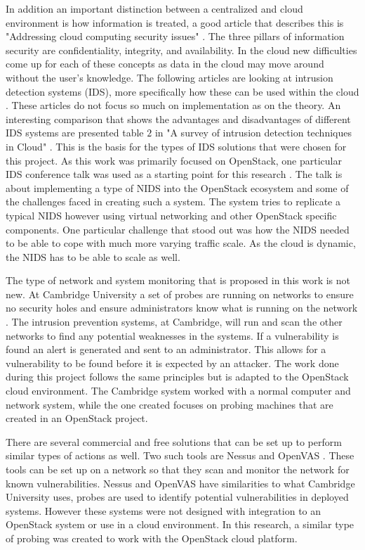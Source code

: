 \documentclass[12pt]{article}
\begin{document}
In addition an important distinction between a centralized and cloud environment is how information is treated, a good article that describes this is "Addressing cloud computing security issues" \cite{zissis2012addressing}. The three pillars of information security are confidentiality, integrity, and availability. In the cloud new difficulties come up for each of these concepts as data in the cloud may move around without the user's knowledge.  The following articles are looking at intrusion detection systems (IDS), more specifically how these can be used within the cloud \cite{SurveyOfIDS, patel2013intrusion}. These articles do not focus so much on implementation as on the theory. An interesting comparison that shows the advantages and disadvantages of different IDS systems are presented table $2$ in "A survey of intrusion detection techniques in Cloud" \cite{SurveyOfIDS}. This is the basis for the types of IDS solutions that were chosen for this project. As this work was primarily focused on OpenStack, one particular IDS conference talk was used as a starting point for this research \cite{videoPresentation}. The talk is about implementing a type of NIDS into the OpenStack ecosystem and some of the challenges faced in creating such a system. The system tries to replicate a typical NIDS however using virtual networking and other OpenStack specific components. One particular challenge that stood out was how the NIDS needed to be able to cope with much more varying traffic scale. As the cloud is dynamic, the NIDS has to be able to scale as well.

The type of network and system monitoring that is proposed in this work is not new. At Cambridge University a set of probes are running on networks to ensure no security holes and ensure administrators know what is running on the network \cite{CambUni}. The intrusion prevention systems, at Cambridge, will run and scan the other networks to find any potential weaknesses in the systems. If a vulnerability is found an alert is generated and sent to an administrator. This allows for a vulnerability to be found before it is expected by an attacker. The work done during this project follows the same principles but is adapted to the OpenStack cloud environment. The Cambridge system worked with a normal computer and network system, while the one created focuses on probing machines that are created in an OpenStack project.

There are several commercial and free solutions that can be set up to perform similar types of actions as well. Two such tools are Nessus \cite{Nessus} and OpenVAS \cite{OpenVAS}. These tools can be set up on a network so that they scan and monitor the network for known vulnerabilities. Nessus and OpenVAS have similarities to what Cambridge University uses, probes are used to identify potential vulnerabilities in deployed systems. However these systems were not designed with integration to an OpenStack system or use in a cloud environment. In this research, a similar type of probing was created to work with the OpenStack cloud platform.
\end{document}
